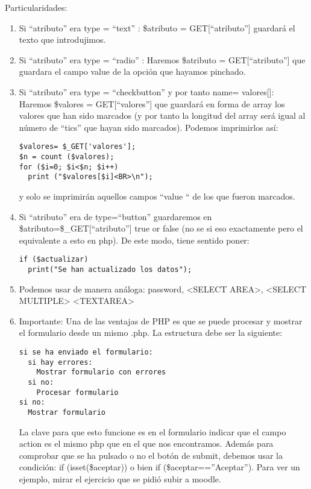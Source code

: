 \documentclass{apuntes}
\begin{document}
Particularidades:
\begin{enumerate}
\item Si “atributo” era type = “text” : \$atributo = GET[“atributo”] guardará el texto que introdujimos.

\item Si “atributo” era type = “radio” : Haremos \$atributo = GET[“atributo”] que guardara el campo value de la opción que hayamos pinchado.

\item Si “atributo” era type = “checkbutton”  y por tanto name= valores[]: Haremos \$valores = GET[“valores”] que guardará en forma de array los valores que han sido marcados (y por tanto la longitud del array será igual al número de “tics” que hayan sido marcados). Podemos imprimirlos así:
\begin{verbatim}
$valores= $_GET['valores'];
$n = count ($valores);
for ($i=0; $i<$n; $i++)
  print ("$valores[$i]<BR>\n");
\end{verbatim}
y solo se imprimirán aquellos campos “value “ de los que fueron marcados.

\item Si “atributo” era de type=“button” guardaremos en \$atributo=\$\_GET[“atributo”] true or false (no se si eso exactamente pero el equivalente a esto en php). De este modo, tiene sentido poner:
\begin{verbatim}
if ($actualizar)
  print("Se han actualizado los datos");
\end{verbatim}

\item Podemos usar de manera análoga: password, <SELECT AREA>, <SELECT MULTIPLE> <TEXTAREA>

\item Importante:
Una de las ventajas de PHP es que se puede procesar y mostrar el formulario desde un mismo .php. La estructura debe ser la siguiente:
\begin{verbatim}
si se ha enviado el formulario:
  si hay errores:
    Mostrar formulario con errores
  si no:
    Procesar formulario
si no:
  Mostrar formulario
\end{verbatim}
La clave para que esto funcione es en el formulario indicar que el campo action es el mismo php que en el que nos encontramos. Además para comprobar que se ha pulsado o no el botón de submit, debemos usar la condición:
if (isset(\$aceptar)) o bien if (\$aceptar==”Aceptar”).
Para ver un ejemplo, mirar el ejercicio que se pidió subir a moodle.
\end{enumerate}
\end{document}
